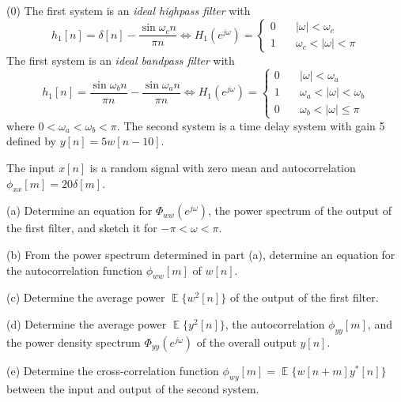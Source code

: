 \documentclass[12pt]{report}
\DeclareMathOperator{\E}{\mathbb{E}} %
\begin{document}
\if(0)
\vspace*{-.3in} The first system is an {\em ideal highpass filter} with
\[
h_1[n]=\delta[n]-\frac{\sin \omega_c n}{\pi n} \Longleftrightarrow
H_1(e^{j\omega}) = \left\{\begin{array}{ll}
0 & \quad |\omega|<\omega_c \\
1 & \quad \omega_c< |\omega|<\pi
\end{array}
\right.
\]
\fi
\vspace*{-.3in} The first system is an {\em ideal bandpass filter} with
\[
h_1[n]=\frac{\sin \omega_b n}{\pi n}-\frac{\sin \omega_a n}{\pi n} \Longleftrightarrow
H_1(e^{j\omega}) = \left\{\begin{array}{ll}
0 & \quad |\omega|<\omega_a \\
1 & \quad \omega_a< |\omega|<\omega_b \\
0 & \quad \omega_{b}< |\omega| \leq \pi
\end{array}
\right.
\] where $0 < \omega_{a}< \omega_{b}<\pi$.
The second system is a time delay system with gain 5 defined by $y[n]= 5w[n-10]$. 

The input
$x[n]$ is a random signal with zero mean and autocorrelation
$\phi_{xx}[m]=20\delta[m]$.
\begin{description}
\item{(a)} Determine an equation for $\Phi_{ww}(e^{j\omega})$, the power
    spectrum of the output of the first filter, and sketch it for $-\pi
    <\omega <\pi$.
\item{(b)} From the power spectrum determined in part (a), determine an
    equation for the autocorrelation function $\phi_{ww}[m]$ of $w[n]$.
\item{(c)} Determine the average power $\E\{w^2[n]\}$ of the output
    of the first filter.
\item{(d)} Determine the average power $\E\{y^2[n]\}$, the
    autocorrelation $\phi_{yy}[m]$, and the power density spectrum
    $\Phi_{yy}(e^{j\omega})$ of the overall output $y[n]$.
\item{(e)}
Determine the cross-correlation function $\phi_{wy}[m]=\E\{w[n+m]y^{*}[n]\}$ between the input and output of the second system.
\end{description}
\end{document}

